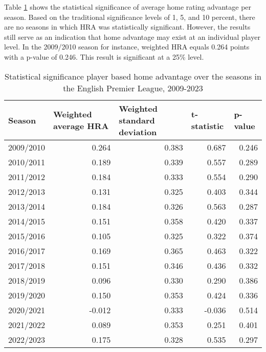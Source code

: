 \noindent
Table \ref{tab:statistical_significance_hra_per_season} shows the statistical significance of average home rating advantage per season. Based on the traditional significance levels of 1, 5, and 10 percent, there are no seasons in which HRA was statistically significant. However, the results still serve as an indication that home advantage may exist at an individual player level. In the 2009/2010 season for instance, weighted HRA equals 0.264 points with a p-value of 0.246. This result is significant at a 25\% level.

\begin{table}[htbp]
    \begin{spacing}{1.5}
    \centering
    \small
    \caption{Statistical significance player based home advantage over the seasons in the English Premier League, 2009-2023}
    \label{tab:statistical_significance_hra_per_season}
    \begin{tabular}{lrrrr}
        \toprule
        \toprule
        \textbf{Season} & \multicolumn{1}{l}{\textbf{Weighted average HRA}} & \multicolumn{1}{l}{\textbf{Weighted standard deviation}} & \multicolumn{1}{l}{\textbf{t-statistic}} & \multicolumn{1}{l}{\textbf{p-value}} \\
        \midrule
        2009/2010 & 0.264 & 0.383 & 0.687 & 0.246 \\
        2010/2011 & 0.189 & 0.339 & 0.557 & 0.289 \\
        2011/2012 & 0.184 & 0.333 & 0.554 & 0.290 \\
        2012/2013 & 0.131 & 0.325 & 0.403 & 0.344 \\
        2013/2014 & 0.184 & 0.326 & 0.563 & 0.287 \\
        2014/2015 & 0.151 & 0.358 & 0.420 & 0.337 \\
        2015/2016 & 0.105 & 0.325 & 0.322 & 0.374 \\
        2016/2017 & 0.169 & 0.365 & 0.463 & 0.322 \\
        2017/2018 & 0.151 & 0.346 & 0.436 & 0.332 \\
        2018/2019 & 0.096 & 0.330 & 0.290 & 0.386 \\
        2019/2020 & 0.150 & 0.353 & 0.424 & 0.336 \\
        2020/2021 & -0.012 & 0.333 & -0.036 & 0.514 \\
        2021/2022 & 0.089 & 0.353 & 0.251 & 0.401 \\
        2022/2023 & 0.175 & 0.328 & 0.535 & 0.297 \\
        \bottomrule
        \bottomrule
    \end{tabular}
    \end{spacing}
\end{table}
